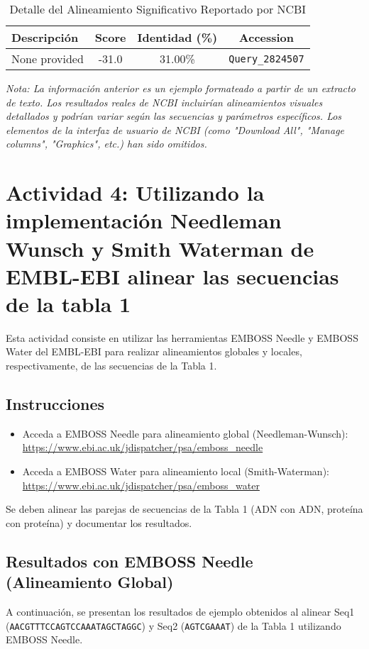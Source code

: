 \documentclass[fleqn,10pt]{article}
\begin{document}
\begin{table}[htbp]
\centering
\caption{Detalle del Alineamiento Significativo Reportado por NCBI}
\label{tab:ncbi_significant_alignment_example}
\begin{tabular}{@{}lccc@{}}
\toprule
\textbf{Descripción} & \textbf{Score} & \textbf{Identidad (\%)} & \textbf{Accession} \\
\midrule
None provided        & -31.0          & 31.00\%                 & \texttt{Query\_2824507}       \\
\bottomrule
\end{tabular}
\end{table}

\textit{Nota: La información anterior es un ejemplo formateado a partir de un extracto de texto. Los resultados reales de NCBI incluirían alineamientos visuales detallados y podrían variar según las secuencias y parámetros específicos. Los elementos de la interfaz de usuario de NCBI (como "Download All", "Manage columns", "Graphics", etc.) han sido omitidos.}

\section{Actividad 4: Utilizando la implementación Needleman Wunsch y Smith Waterman de EMBL-EBI alinear las secuencias de la tabla 1}

Esta actividad consiste en utilizar las herramientas EMBOSS Needle y EMBOSS Water del EMBL-EBI para realizar alineamientos globales y locales, respectivamente, de las secuencias de la Tabla 1.

\subsection*{Instrucciones}
\begin{itemize}
    \item Acceda a EMBOSS Needle para alineamiento global (Needleman-Wunsch): \url{https://www.ebi.ac.uk/jdispatcher/psa/emboss_needle}
    \item Acceda a EMBOSS Water para alineamiento local (Smith-Waterman): \url{https://www.ebi.ac.uk/jdispatcher/psa/emboss_water}
\end{itemize}
Se deben alinear las parejas de secuencias de la Tabla 1 (ADN con ADN, proteína con proteína) y documentar los resultados.

\subsection*{Resultados con EMBOSS Needle (Alineamiento Global)}
A continuación, se presentan los resultados de ejemplo obtenidos al alinear Seq1 (\texttt{AACGTTTCCAGTCCAAATAGCTAGGC}) y Seq2 (\texttt{AGTCGAAAT}) de la Tabla 1 utilizando EMBOSS Needle.
\end{document}
